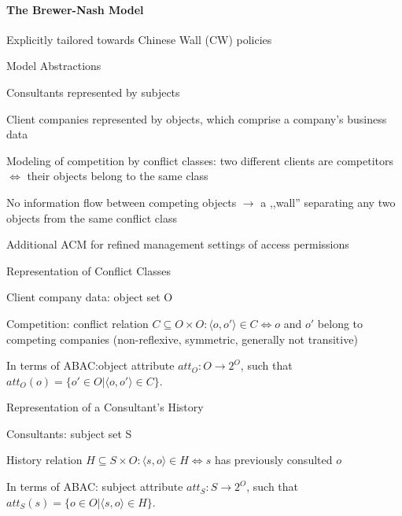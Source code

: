 \documentclass[a4paper]{article}
\begin{document}
\begin{multicols}{3}
    \paragraph{The Brewer-Nash Model}
    Explicitly tailored towards Chinese Wall (CW) policies

    Model Abstractions
    \begin{itemize*}
        \item Consultants represented by subjects
        \item Client companies represented by objects, which comprise a company’s business data
        \item Modeling of competition by conflict classes: two different clients are competitors $\Leftrightarrow$ their objects belong to the same class
        \item No information flow between competing objects $\rightarrow$ a ,,wall'' separating any two objects from the same conflict class
        \item Additional ACM for refined management settings of access permissions
    \end{itemize*}

    Representation of Conflict Classes
    \begin{itemize*}
        \item Client company data: object set O
        \item Competition: conflict relation $C\subseteq O\times O:\langle o,o'\rangle \in C\Leftrightarrow o$ and $o'$ belong to competing companies (non-reflexive, symmetric, generally not transitive)
        \item In terms of ABAC:object attribute $att_O:O\rightarrow 2^O$, such that $att_O(o)=\{o'\in O|\langle o,o'\rangle \in C\}$.
    \end{itemize*}

    Representation of a Consultant’s History
    \begin{itemize*}
        \item Consultants: subject set S
        \item History relation $H\subseteq S\times O:\langle s,o\rangle \in H\Leftrightarrow s$ has previously consulted $o$
        \item In terms of ABAC: subject attribute $att_S:S\rightarrow 2^O$, such that $att_S(s)=\{o\in O|\langle s,o\rangle \in H\}$.
    \end{itemize*}


\end{multicols}
\end{document}
